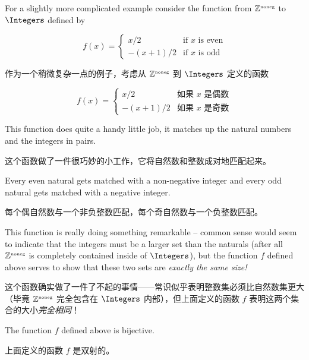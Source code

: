 For a slightly more complicated example 
consider the function from ${\mathbb Z}^{\mbox{\tiny noneg}}$ to $\Integers$ defined by

\[ f(x) = \left\{ \begin{array}{cl} x/2 & \mbox{if $x$ is even} \\ -(x+1)/2 & \mbox{if $x$ is odd} \end{array} \right. \]

作为一个稍微复杂一点的例子，考虑从 ${\mathbb Z}^{\mbox{\tiny noneg}}$ 到 $\Integers$ 定义的函数

\[ f(x) = \left\{ \begin{array}{cl} x/2 & \mbox{如果 $x$ 是偶数} \\ -(x+1)/2 & \mbox{如果 $x$ 是奇数} \end{array} \right. \]

This function does quite a handy little job, it matches up the natural
numbers and the integers in pairs.

这个函数做了一件很巧妙的小工作，它将自然数和整数成对地匹配起来。

Every even natural gets matched with
a non-negative integer and every odd natural gets matched with a 
negative integer.

每个偶自然数与一个非负整数匹配，每个奇自然数与一个负整数匹配。

This function is really doing 
something remarkable -- common sense would seem to indicate that the integers
must be a larger set than the naturals (after all ${\mathbb Z}^{\mbox{\tiny noneg}}$ is completely
contained inside of $\Integers$), but the function $f$ defined above serves
to show that these two sets are \emph{exactly the same size!}

这个函数确实做了一件了不起的事情——常识似乎表明整数集必须比自然数集更大（毕竟 ${\mathbb Z}^{\mbox{\tiny noneg}}$ 完全包含在 $\Integers$ 内部），但上面定义的函数 $f$ 表明这两个集合的大小\emph{完全相同}！

\begin{thm}
The function $f$ defined above is bijective.
\end{thm}

\begin{thm}
上面定义的函数 $f$ 是双射的。
\end{thm}

